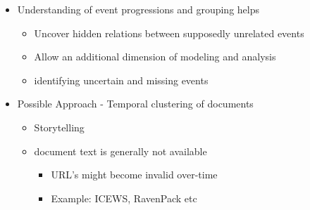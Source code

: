\begin{frame}
    \begin{itemize}
    \item Understanding of event progressions and grouping helps
    \begin{itemize}
        \item Uncover hidden relations between supposedly unrelated events
        \item Allow an additional dimension of modeling and analysis
        \item identifying uncertain and missing events
    \end{itemize}
    
    \item Possible Approach - Temporal clustering of documents
        \begin{itemize}
                \item Storytelling~\cite{schlachter2015leveraging}
                \item document text is generally not available 
                    \begin{itemize}
                        \item URL's might become invalid over-time
                        \item Example: ICEWS, RavenPack etc
                    \end{itemize}
        \end{itemize}
\end{itemize}
\end{frame}

